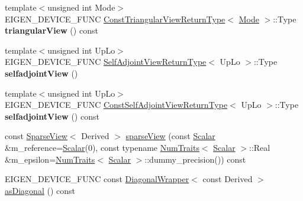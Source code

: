 \begin{DoxyCompactItemize}
{\footnotesize template$<$unsigned int Mode$>$ }\\E\+I\+G\+E\+N\+\_\+\+D\+E\+V\+I\+C\+E\+\_\+\+F\+U\+NC \mbox{\hyperlink{struct_eigen_1_1_matrix_base_1_1_const_triangular_view_return_type}{Const\+Triangular\+View\+Return\+Type}}$<$ \mbox{\hyperlink{struct_mode}{Mode}} $>$\+::Type {\bfseries triangular\+View} () const
\item 
\mbox{\label{class_eigen_1_1_matrix_base_af8c1ed9d1dd0a96c01d2093b10d1fda7}} 
{\footnotesize template$<$unsigned int Up\+Lo$>$ }\\E\+I\+G\+E\+N\+\_\+\+D\+E\+V\+I\+C\+E\+\_\+\+F\+U\+NC \mbox{\hyperlink{struct_eigen_1_1_matrix_base_1_1_self_adjoint_view_return_type}{Self\+Adjoint\+View\+Return\+Type}}$<$ Up\+Lo $>$\+::Type {\bfseries selfadjoint\+View} ()
\item 
\mbox{\label{class_eigen_1_1_matrix_base_ac93d38f5582b541b57132008d7988fdc}} 
{\footnotesize template$<$unsigned int Up\+Lo$>$ }\\E\+I\+G\+E\+N\+\_\+\+D\+E\+V\+I\+C\+E\+\_\+\+F\+U\+NC \mbox{\hyperlink{struct_eigen_1_1_matrix_base_1_1_const_self_adjoint_view_return_type}{Const\+Self\+Adjoint\+View\+Return\+Type}}$<$ Up\+Lo $>$\+::Type {\bfseries selfadjoint\+View} () const
\item 
const \mbox{\hyperlink{class_eigen_1_1_sparse_view}{Sparse\+View}}$<$ Derived $>$ \mbox{\hyperlink{class_eigen_1_1_matrix_base_a320dd291cbf4339c6118c41521b75350}{sparse\+View}} (const \mbox{\hyperlink{class_eigen_1_1_dense_base_a5feed465b3a8e60c47e73ecce83e39a2}{Scalar}} \&m\+\_\+reference=\mbox{\hyperlink{class_eigen_1_1_dense_base_a5feed465b3a8e60c47e73ecce83e39a2}{Scalar}}(0), const typename \mbox{\hyperlink{struct_eigen_1_1_num_traits}{Num\+Traits}}$<$ \mbox{\hyperlink{class_eigen_1_1_dense_base_a5feed465b3a8e60c47e73ecce83e39a2}{Scalar}} $>$\+::Real \&m\+\_\+epsilon=\mbox{\hyperlink{struct_eigen_1_1_num_traits}{Num\+Traits}}$<$ \mbox{\hyperlink{class_eigen_1_1_dense_base_a5feed465b3a8e60c47e73ecce83e39a2}{Scalar}} $>$\+::dummy\+\_\+precision()) const
\item 
E\+I\+G\+E\+N\+\_\+\+D\+E\+V\+I\+C\+E\+\_\+\+F\+U\+NC const \mbox{\hyperlink{class_eigen_1_1_diagonal_wrapper}{Diagonal\+Wrapper}}$<$ const Derived $>$ \mbox{\hyperlink{class_eigen_1_1_matrix_base_a14235b62c90f93fe910070b4743782d0}{as\+Diagonal}} () const
\item 
\mbox{\label{class_eigen_1_1_matrix_base_ac5e5e8ad184d4171a969d56431b3f84c}} 

\end{DoxyCompactItemize}
